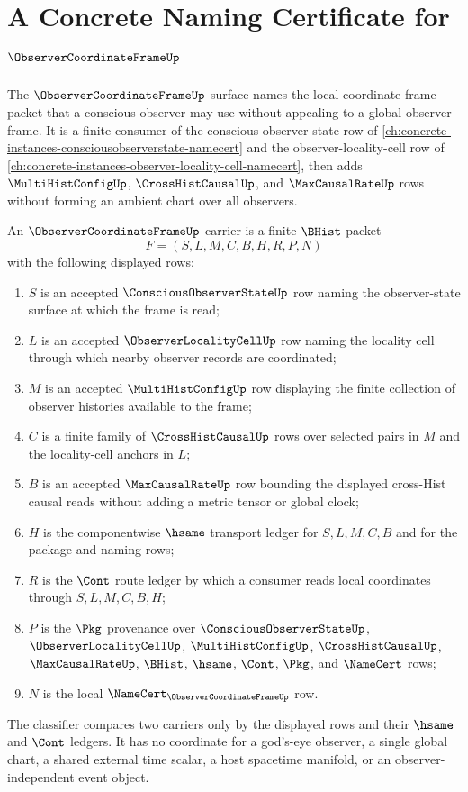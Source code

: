 \chapter{A Concrete Naming Certificate for $\ObserverCoordinateFrameUp$}
\label{ch:concrete-instances-observer-coordinate-frame-namecert}

The $\ObserverCoordinateFrameUp$ surface names the local coordinate-frame packet that a conscious observer may use without appealing to a global observer frame. It is a finite consumer of the conscious-observer-state row of \autoref{ch:concrete-instances-consciousobserverstate-namecert} and the observer-locality-cell row of \autoref{ch:concrete-instances-observer-locality-cell-namecert}, then adds $\MultiHistConfigUp$, $\CrossHistCausalUp$, and $\MaxCausalRateUp$ rows without forming an ambient chart over all observers.

\begin{definition}
\label{def:observer-coordinate-frame-carrier}
An $\ObserverCoordinateFrameUp$ carrier is a finite $\BHist$ packet
$$
F=(S,L,M,C,B,H,R,P,N)
$$
with the following displayed rows:
\begin{enumerate}
\item $S$ is an accepted $\ConsciousObserverStateUp$ row naming the observer-state surface at which the frame is read;
\item $L$ is an accepted $\ObserverLocalityCellUp$ row naming the locality cell through which nearby observer records are coordinated;
\item $M$ is an accepted $\MultiHistConfigUp$ row displaying the finite collection of observer histories available to the frame;
\item $C$ is a finite family of $\CrossHistCausalUp$ rows over selected pairs in $M$ and the locality-cell anchors in $L$;
\item $B$ is an accepted $\MaxCausalRateUp$ row bounding the displayed cross-Hist causal reads without adding a metric tensor or global clock;
\item $H$ is the componentwise $\hsame$ transport ledger for $S,L,M,C,B$ and for the package and naming rows;
\item $R$ is the $\Cont$ route ledger by which a consumer reads local coordinates through $S,L,M,C,B,H$;
\item $P$ is the $\Pkg$ provenance over $\ConsciousObserverStateUp$, $\ObserverLocalityCellUp$, $\MultiHistConfigUp$, $\CrossHistCausalUp$, $\MaxCausalRateUp$, $\BHist$, $\hsame$, $\Cont$, $\Pkg$, and $\NameCert$ rows;
\item $N$ is the local $\NameCert_{\ObserverCoordinateFrameUp}$ row.
\end{enumerate}
The classifier compares two carriers only by the displayed rows and their $\hsame$ and $\Cont$ ledgers. It has no coordinate for a god's-eye observer, a single global chart, a shared external time scalar, a host spacetime manifold, or an observer-independent event object.
\end{definition}

